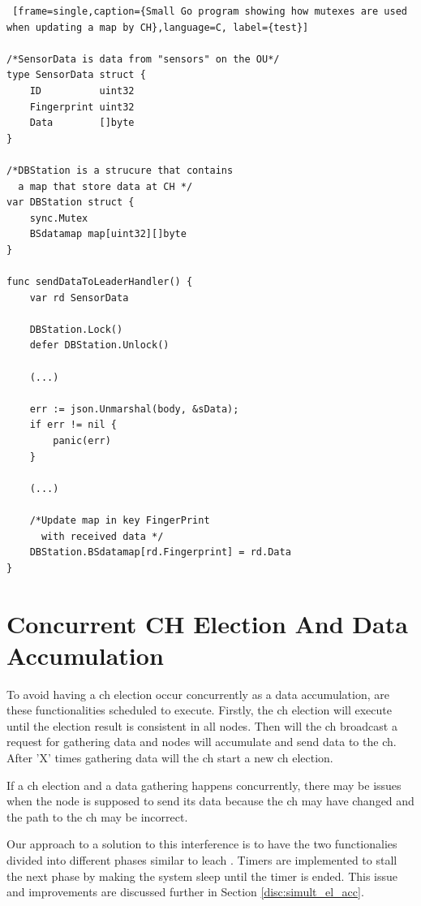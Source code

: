 \documentclass[USenglish]{uit-thesis}
\begin{document}
\newpage

\begin{lstlisting} [frame=single,caption={Small Go program showing how mutexes are used when updating a map by CH},language=C, label={test}]

/*SensorData is data from "sensors" on the OU*/
type SensorData struct {
	ID          uint32
	Fingerprint uint32
	Data        []byte
}

/*DBStation is a strucure that contains 
  a map that store data at CH */
var DBStation struct {
	sync.Mutex
	BSdatamap map[uint32][]byte
}

func sendDataToLeaderHandler() {
	var rd SensorData
	
	DBStation.Lock()
	defer DBStation.Unlock()
	
	(...)
	
	err := json.Unmarshal(body, &sData); 
	if err != nil {
		panic(err)
	}
	
	(...)
	
	/*Update map in key FingerPrint
	  with received data */
	DBStation.BSdatamap[rd.Fingerprint] = rd.Data
}
\end{lstlisting}

\newpage

\section{Concurrent CH Election And Data Accumulation}
To avoid having a \gls{ch} election occur concurrently as a data accumulation, are these functionalities scheduled to execute.
Firstly, the \gls{ch} election will execute until the election result is consistent in all nodes. Then will the \gls{ch} broadcast a request for gathering data and nodes will accumulate and send data to the \gls{ch}. After 'X' times gathering data will the \gls{ch} start a new \gls{ch} election. 

If a \gls{ch} election and a data gathering happens concurrently, there may be issues when the node is supposed to send its data because the \gls{ch} may have changed and the path to the \gls{ch} may be incorrect. 

Our approach to a solution to this interference is to have the two functionalies divided into different phases similar to \gls{leach} \cite{leach}. Timers are implemented to stall the next phase by making the system sleep until the timer is ended. This issue and improvements are discussed further in Section \ref{disc:simult_el_acc}.
\end{document}
